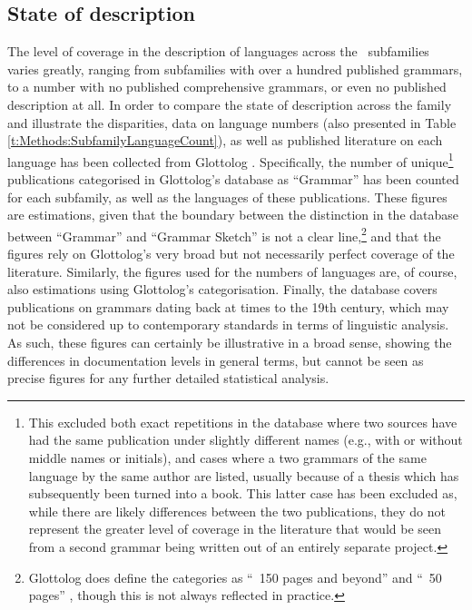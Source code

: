 \subsection{State of description}\label{ss:Description:StateOfDescription}
The level of coverage in the description of languages across the \lfam\ subfamilies varies greatly, ranging from subfamilies with over a hundred published grammars, to a number with no published comprehensive grammars, or even no published description at all. In order to compare the state of description across the family and illustrate the disparities, data on language numbers (also presented in Table \ref{t:Methods:SubfamilyLanguageCount}), as well as published literature on each language has been collected from Glottolog \cite{glottolog}. Specifically, the number of unique\footnote{This excluded both exact repetitions in the database where two sources have had the same publication under slightly different names (e.g., with or without middle names or initials), and cases where a two grammars of the same language by the same author are listed, usually because of a thesis which has subsequently been turned into a book. This latter case has been excluded as, while there are likely differences between the two publications, they do not represent the greater level of coverage in the literature that would be seen from a second grammar being written out of an entirely separate project.} publications categorised in Glottolog's database as ``Grammar'' has been counted for each subfamily, as well as the languages of these publications. These figures are estimations, given that the boundary between the distinction in the database between ``Grammar'' and ``Grammar Sketch'' is not a clear line,\footnote{Glottolog does define the categories as ``~150 pages and beyond'' and ``~50 pages'' \cite[Glossary]{glottolog}, though this is not always reflected in practice.} and that the figures rely on Glottolog's very broad but not necessarily perfect coverage of the literature. Similarly, the figures used for the numbers of languages are, of course, also estimations using Glottolog's categorisation. Finally, the database covers publications on grammars dating back at times to the 19th century, which may not be considered up to contemporary standards in terms of linguistic analysis. As such, these figures can certainly be illustrative in a broad sense, showing the differences in documentation levels in general terms, but cannot be seen as precise figures for any further detailed statistical analysis.

